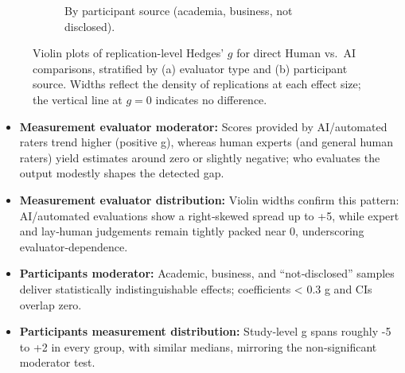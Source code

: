 \documentclass[manuscript, screen, review, acmsmall, anonymous]{acmart}
\begin{document}
\begin{figure}[H]
\begin{subfigure}[t]{0.49\linewidth}
    \caption{By participant source (academia, business, not disclosed).}
    \label{fig:versus_raw_violin_participants}
  \end{subfigure}
  \caption{Violin plots of replication-level Hedges’ $g$ for direct Human vs.\ AI comparisons, stratified by (a) evaluator type and (b) participant source. Widths reflect the density of replications at each effect size; the vertical line at $g=0$ indicates no difference.}
  \label{fig:versus_raw_violins_eval_part}
\end{figure}
\begin{itemize}
  \item \textbf{Measurement evaluator moderator:} Scores provided by AI/automated raters trend higher (positive g), whereas human experts (and general human raters) yield estimates around zero or slightly negative; who evaluates the output modestly shapes the detected gap.
  \item \textbf{Measurement evaluator distribution:} Violin widths confirm this pattern: AI/automated evaluations show a right‑skewed spread up to +5, while expert and lay‑human judgements remain tightly packed near 0, underscoring evaluator‑dependence.
  \item \textbf{Participants moderator:} Academic, business, and “not‑disclosed” samples deliver statistically indistinguishable effects; coefficients < 0.3 g and CIs overlap zero.
  \item \textbf{Participants measurement distribution:} Study‑level g spans roughly -5 to +2 in every group, with similar medians, mirroring the non‑significant moderator test.
\end{itemize}
\end{document}
